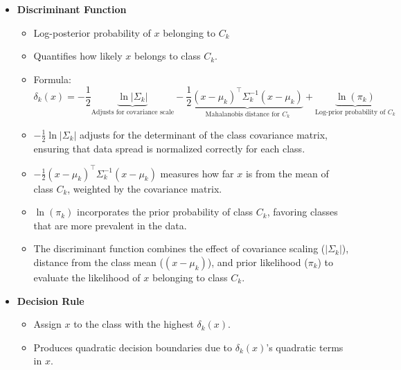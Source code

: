 \documentclass[12pt]{article}
\begin{document}
\begin{itemize}
\begin{itemize}
    \item \textbf{Discriminant Function}
    \begin{itemize}
        \item Log-posterior probability of $x$ belonging to $C_k$
        \item Quantifies how likely $x$ belongs to class $C_k$.
        \item Formula:
        \[
        \delta_k(x) = -\frac{1}{2}\underbrace{\ln|\Sigma_k|}_{\text{Adjusts for covariance scale}} 
        - \frac{1}{2}\underbrace{(x-\mu_k)^\top \Sigma_k^{-1}(x-\mu_k)}_{\text{Mahalanobis distance for $C_k$}} 
        + \underbrace{\ln(\pi_k)}_{\text{Log-prior probability of $C_k$}}
        \]
        \item $-\frac{1}{2}\ln|\Sigma_k|$ adjusts for the determinant of the class covariance matrix, ensuring that data spread is normalized correctly for each class.
        \item $-\frac{1}{2}(x-\mu_k)^\top \Sigma_k^{-1}(x-\mu_k)$ measures how far \(x\) is from the mean of class \(C_k\), weighted by the covariance matrix.
        \item $\ln(\pi_k)$ incorporates the prior probability of class \(C_k\), favoring classes that are more prevalent in the data.
        \item The discriminant function combines the effect of covariance scaling (\(|\Sigma_k|\)), distance from the class mean (\((x-\mu_k)\)), and prior likelihood (\(\pi_k\)) to evaluate the likelihood of \(x\) belonging to class \(C_k\).
    \end{itemize}
        \item \textbf{Decision Rule}
        \begin{itemize}
            \item Assign $x$ to the class with the highest $\delta_k(x)$.
            \item Produces quadratic decision boundaries due to $\delta_k(x)$'s quadratic terms in $x$.
        \end{itemize}
    \end{itemize}
    

\end{itemize}
\end{document}
